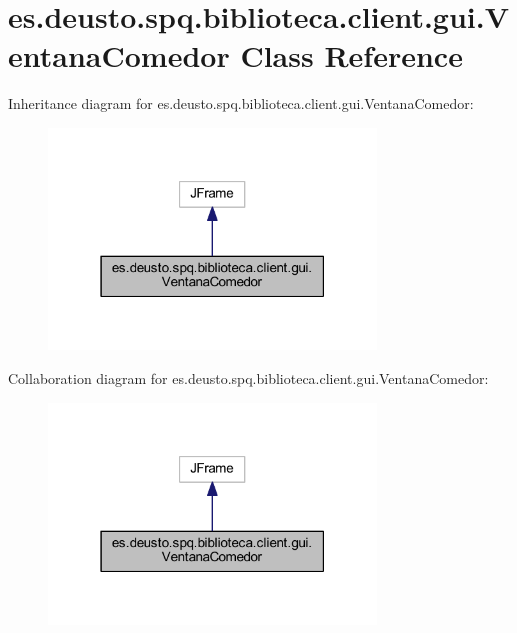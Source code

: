 \hypertarget{classes_1_1deusto_1_1spq_1_1biblioteca_1_1client_1_1gui_1_1_ventana_comedor}{}\section{es.\+deusto.\+spq.\+biblioteca.\+client.\+gui.\+Ventana\+Comedor Class Reference}
\label{classes_1_1deusto_1_1spq_1_1biblioteca_1_1client_1_1gui_1_1_ventana_comedor}


Inheritance diagram for es.\+deusto.\+spq.\+biblioteca.\+client.\+gui.\+Ventana\+Comedor\+:
\nopagebreak
\begin{figure}[H]
\begin{center}
\leavevmode
\includegraphics[width=247pt]{classes_1_1deusto_1_1spq_1_1biblioteca_1_1client_1_1gui_1_1_ventana_comedor__inherit__graph}
\end{center}
\end{figure}


Collaboration diagram for es.\+deusto.\+spq.\+biblioteca.\+client.\+gui.\+Ventana\+Comedor\+:
\nopagebreak
\begin{figure}[H]
\begin{center}
\leavevmode
\includegraphics[width=247pt]{classes_1_1deusto_1_1spq_1_1biblioteca_1_1client_1_1gui_1_1_ventana_comedor__coll__graph}
\end{center}
\end{figure}

